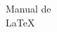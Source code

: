 \documentclass{article}
\begin{document}
\begin{center}
	Manual de\\
	\LaTeX
\end{center}
\end{document}
